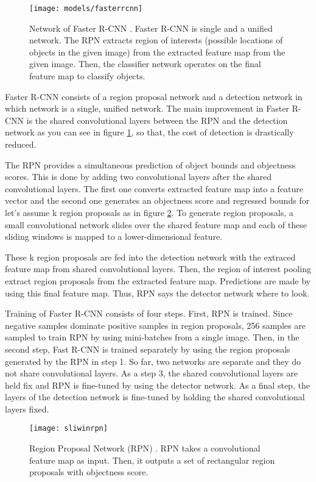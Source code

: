 \documentclass{article}
\begin{document}
\setlength{\parindent}{6ex}

\begin{figure}
    \centering
    \texttt{[image: models/fasterrcnn]}
    \caption{Network of Faster R-CNN \cite{fasterrcnncite}. 
    Faster R-CNN is single and a unified network. The RPN extracts 
    region of interests (possible locations of objects in the given image) 
    from the extracted feature map from the given image. Then, the classifier 
    network operates on the final feature map to classify objects.}
    \label{fig:fasterrcnn1}
\end{figure}

\indent

Faster R-CNN \cite{fasterrcnncite} consists of a region proposal network and a detection network in which 
network is a single, unified network. 
The main improvement in Faster R-CNN is the shared convolutional layers between 
the RPN and the detection network as you can see in figure \ref{fig:fasterrcnn1}, so that, the cost of 
detection is drastically reduced. \par

The RPN provides a simultaneous prediction of object bounds and 
objectness scores. This is done by adding two convolutional layers after the 
shared convolutional layers. The first one converts extracted feature map into a 
feature vector and the second one generates an objectness score and regressed 
bounds for let's assume k region proposals as in figure \ref{fig:sliwinrpn1}. To 
generate region proposals, a small convolutional network slides over the shared 
feature map and each of these sliding windows is mapped to a lower-dimensional 
feature. \par

These k region proposals are fed into the detection network with the extraced feature 
map from shared convolutional layers. Then, the region of interest pooling extract 
region proposals from the extracted feature map. Predictions are made by using this 
final feature map. Thus, RPN says the detector network where to look. \par

Training of Faster R-CNN consists of four steps. First, RPN is trained. Since 
negative samples dominate positive samples in region proposals, 256 samples are 
sampled to train RPN by using mini-batches from a single image. Then, in the 
second step, Fast R-CNN is trained separately by using the region proposals 
generated by the RPN in step 1. So far, two networks are separate and they do 
not share convolutional layers. As a step 3, the shared convolutional layers are 
held fix and RPN is fine-tuned by using the detector network. As a final step, the 
layers of the detection network is fine-tuned by holding the shared convolutional layers 
fixed.
\begin{figure}
    \centering
    \texttt{[image: sliwinrpn]}
    \caption{Region Proposal Network (RPN) \cite{fasterrcnncite}. 
    RPN takes a convolutional feature map as input. Then, it outputs 
    a set of rectangular region proposals with objectness score.}
    \label{fig:sliwinrpn1}
\end{figure}
\end{document}
